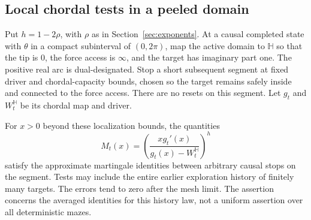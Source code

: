 \subsection{Local chordal tests in a peeled domain}
\label{peel:localtests}

Put $h=1-2\rho$, with $\rho$ as in Section~\ref{sec:exponents}.
At a causal completed state with $\theta$ in a compact subinterval of
$(0,2\pi)$, map the active domain to $\mathbb H$ so that the tip is
$0$, the force access is $\infty$, and the target has imaginary part
one.  The positive real arc is dual-designated.  Stop a short subsequent
segment at fixed driver and chordal-capacity bounds, chosen so the
target remains safely inside and connected to the force access.  There
are no resets on this segment.  Let $g_t$ and $W_t^{\mathbb H}$ be its
chordal map and driver.

\begin{proposition}\label{peel:martingales}
For $x>0$ beyond these localization bounds, the quantities
\begin{equation}\label{peel:test}
 M_t(x)=\left(\frac{xg_t'(x)}{g_t(x)-W_t^{\mathbb H}}\right)^h
\end{equation}
satisfy the approximate martingale identities between arbitrary causal
stops on the segment.  Tests may include the entire earlier exploration
history of finitely many targets.  The errors tend to zero after the
mesh limit.  The assertion concerns the averaged identities for this
history law, not a uniform assertion over all deterministic mazes.
\end{proposition}


